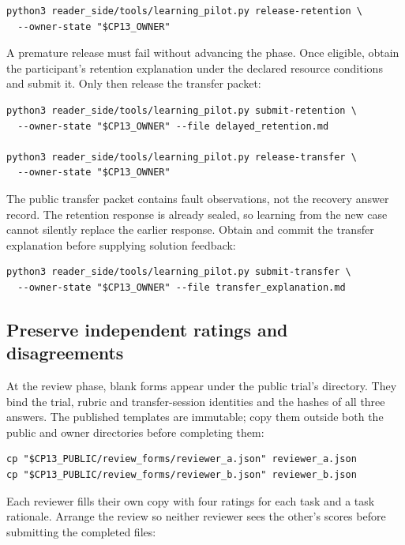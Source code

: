 \begin{lstlisting}
python3 reader_side/tools/learning_pilot.py release-retention \
  --owner-state "$CP13_OWNER"
\end{lstlisting}

A premature release must fail without advancing the phase. Once eligible, obtain the participant's retention explanation under the declared resource conditions and submit it. Only then release the transfer packet:

\begin{lstlisting}
python3 reader_side/tools/learning_pilot.py submit-retention \
  --owner-state "$CP13_OWNER" --file delayed_retention.md

python3 reader_side/tools/learning_pilot.py release-transfer \
  --owner-state "$CP13_OWNER"
\end{lstlisting}

The public transfer packet contains fault observations, not the recovery answer record. The retention response is already sealed, so learning from the new case cannot silently replace the earlier response. Obtain and commit the transfer explanation before supplying solution feedback:

\begin{lstlisting}
python3 reader_side/tools/learning_pilot.py submit-transfer \
  --owner-state "$CP13_OWNER" --file transfer_explanation.md
\end{lstlisting}

\subsection{Preserve independent ratings and disagreements}

At the review phase, blank forms appear under the public trial's  directory. They bind the trial, rubric and transfer-session identities and the hashes of all three answers. The published templates are immutable; copy them outside both the public and owner directories before completing them:

\Needspace{6\baselineskip}
\begin{lstlisting}
cp "$CP13_PUBLIC/review_forms/reviewer_a.json" reviewer_a.json
cp "$CP13_PUBLIC/review_forms/reviewer_b.json" reviewer_b.json
\end{lstlisting}

Each reviewer fills their own copy with four ratings for each task and a task rationale. Arrange the review so neither reviewer sees the other's scores before submitting the completed files:

